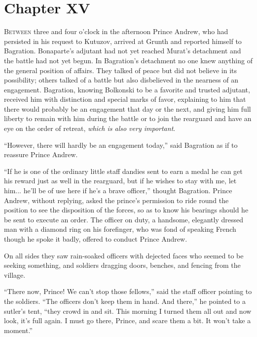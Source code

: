\chapter*{Chapter XV}
\ifaudio     {} \fi

\lettrine[lines=2, loversize=0.3, lraise=0]{\initfamily B}{etween}
three and four o'clock in the afternoon Prince Andrew,
who had persisted in his request to Kutuzov, arrived at Grunth
and reported himself to Bagration. Bonaparte's adjutant had not
yet reached Murat's detachment and the battle had not yet
begun. In Bagration's detachment no one knew anything of the
general position of affairs. They talked of peace but did not
believe in its possibility; others talked of a battle but also
disbelieved in the nearness of an engagement. Bagration, knowing
Bolkonski to be a favorite and trusted adjutant, received him
with distinction and special marks of favor, explaining to him
that there would probably be an engagement that day or the next,
and giving him full liberty to remain with him during the battle
or to join the rearguard and have an eye on the order of retreat,
\emph{which is also very important}.

``However, there will hardly be an engagement today,'' said
Bagration as if to reassure Prince Andrew.

``If he is one of the ordinary little staff dandies sent to earn
a medal he can get his reward just as well in the rearguard, but
if he wishes to stay with me, let him... he'll be of use here if
he's a brave officer,'' thought Bagration. Prince Andrew, without
replying, asked the prince's permission to ride round the
position to see the disposition of the forces, so as to know his
bearings should he be sent to execute an order. The officer on
duty, a handsome, elegantly dressed man with a diamond ring on
his forefinger, who was fond of speaking French though he spoke
it badly, offered to conduct Prince Andrew.

On all sides they saw rain-soaked officers with dejected faces
who seemed to be seeking something, and soldiers dragging doors,
benches, and fencing from the village.

``There now, Prince! We can't stop those fellows,'' said the
staff officer pointing to the soldiers. ``The officers don't keep
them in hand. And there,'' he pointed to a sutler's tent, ``they
crowd in and sit. This morning I turned them all out and now
look, it's full again. I must go there, Prince, and scare them a
bit. It won't take a moment.''

